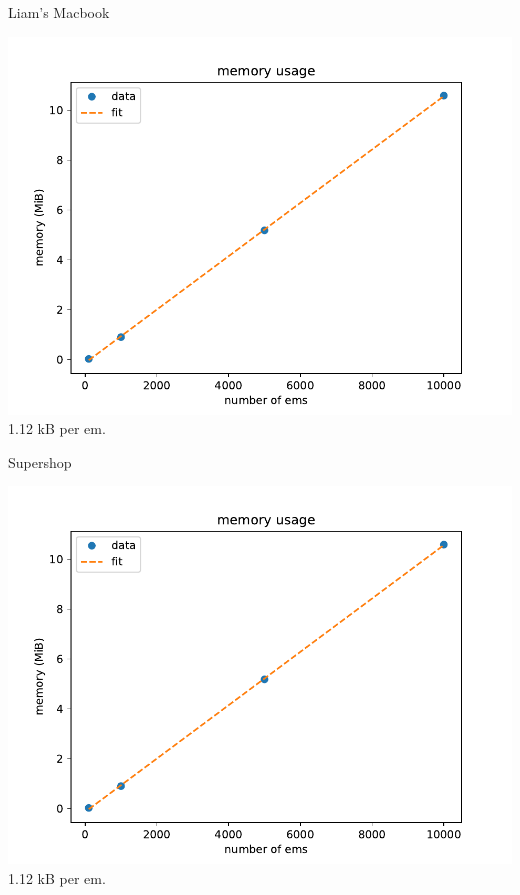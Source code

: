 \documentclass[dvipsnames]{beamer}
\begin{document}
\begin{frame}{Liam's Macbook}
\begin{center}
\includegraphics[height=0.8\textheight]{mem_num_ems}
1.12 kB per em.
\end{center}
\end{frame}

\begin{frame}{Supershop}
\begin{center}
\includegraphics[height=0.8\textheight]{mem_num_ems}
1.12 kB per em.
\end{center}
\end{frame}
\end{document}
